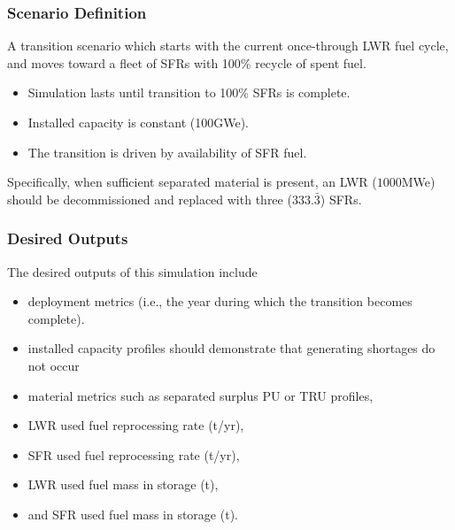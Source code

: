 
\begin{frame}[fragile]
  \frametitle{Scenario Definition}
A transition scenario which starts with the current once-through LWR fuel cycle, and moves toward a fleet of SFRs with 100\% recycle of spent fuel. 
\begin{itemize}
\item Simulation lasts until transition to 100\% SFRs is complete. 
\item Installed capacity is constant (100GWe).  
\item The transition is driven by availability of SFR fuel.
\end{itemize}

Specifically, when sufficient separated material is present, an LWR ($1000$MWe) should be decommissioned and replaced with three ($333.\bar{3}$) SFRs.

\end{frame}
\begin{frame}[fragile]
  \frametitle{Desired Outputs}
The desired outputs of this simulation include 
\begin{itemize}
\item deployment metrics (i.e., the year during which the transition becomes complete). 
\item installed capacity profiles should demonstrate that generating shortages do not occur
\item material metrics such as separated surplus PU or TRU profiles, 
\item LWR used fuel reprocessing rate (t/yr), 
\item SFR used fuel reprocessing rate (t/yr),  
\item LWR used fuel mass in storage (t), 
\item and SFR used fuel mass in storage (t).
\end{itemize}
\end{frame}
